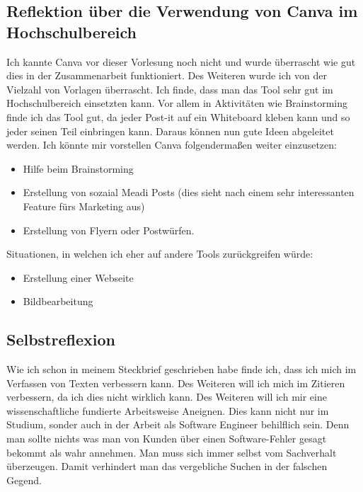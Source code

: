 \documentclass[12pt]{article}
\begin{document}
\subsection{Reflektion über die Verwendung von Canva im Hochschulbereich}
Ich kannte Canva vor dieser Vorlesung noch nicht und wurde überrascht wie gut dies in der Zusammenarbeit funktioniert. Des Weiteren wurde ich von der Vielzahl von Vorlagen überrascht. Ich finde, dass man das Tool sehr gut im Hochschulbereich einsetzten kann. Vor allem in Aktivitäten wie Brainstorming finde ich das Tool gut, da jeder Post-it auf ein Whiteboard kleben kann und so jeder seinen Teil einbringen kann. Daraus können nun gute Ideen abgeleitet werden. Ich könnte mir vorstellen Canva folgendermaßen weiter einzusetzen:
\begin{itemize}
 \item Hilfe beim Brainstorming
 \item Erstellung von sozaial Meadi Posts (dies sieht nach einem sehr interessanten Feature fürs Marketing aus)
 \item Erstellung von Flyern oder Postwürfen.
\end{itemize}
Situationen, in welchen ich eher auf andere Tools zurückgreifen würde:
\begin{itemize}
 \item Erstellung einer Webseite
 \item Bildbearbeitung
\end{itemize}
\subsection{Selbstreflexion}
Wie ich schon in meinem Steckbrief geschrieben habe finde ich, dass ich mich im Verfassen von Texten verbessern kann. Des Weiteren will ich mich im Zitieren verbessern, da ich dies nicht wirklich kann. Des Weiteren will ich mir eine wissenschaftliche fundierte Arbeitsweise Aneignen. Dies kann nicht nur im Studium, sonder auch in der Arbeit als Software Engineer behilflich sein. Denn man sollte nichts was man von Kunden über einen Software-Fehler gesagt bekommt als wahr annehmen. Man muss sich immer selbst vom Sachverhalt überzeugen. Damit verhindert man das vergebliche Suchen in der falschen Gegend.
\listoffigures
\lstlistoflistings
\end{document}
